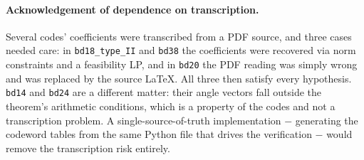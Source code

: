 \documentclass[11pt]{article}
\begin{document}
\paragraph{Acknowledgement of dependence on transcription.}
Several codes' coefficients were transcribed from a PDF source, and three
cases needed care: in \texttt{bd18\_type\_II} and \texttt{bd38} the
coefficients were recovered via norm constraints and a feasibility LP, and in
\texttt{bd20} the PDF reading was simply wrong and was replaced by the source
\LaTeX. All three then satisfy every hypothesis. \texttt{bd14} and
\texttt{bd24} are a different matter: their angle vectors fall outside the
theorem's arithmetic conditions, which is a property of the codes and not a
transcription problem. A single-source-of-truth implementation $-$ generating
the codeword tables from the same Python file that drives the verification $-$
would remove the transcription risk entirely.
\end{document}
